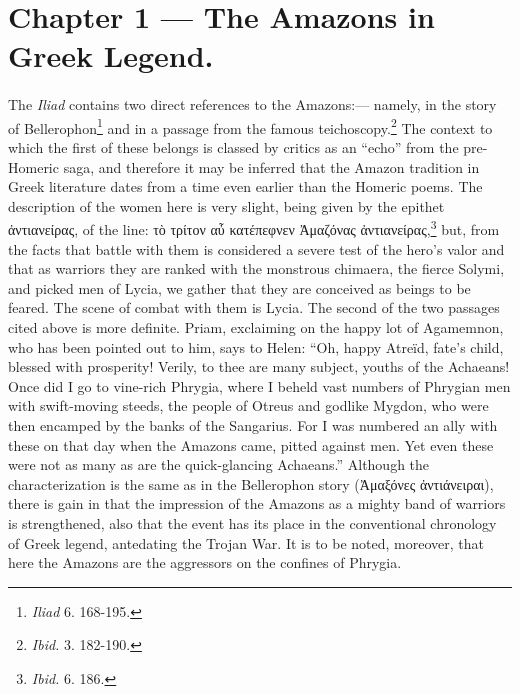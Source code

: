\documentclass[a4paper, 12pt, oneside]{article}
\begin{document}
\paragraph{}
\section{Chapter 1 --- The Amazons in Greek Legend.}
\paragraph{}
The \emph{Iliad} contains two direct references to the Amazons:--- namely, in the story of Bellerophon\footnote{\emph{Iliad} 6. 168-195.} and in a passage from the famous teichoscopy.\footnote{\emph{Ibid.} 3. 182-190.} The context to which the first of these belongs is classed by critics as an ``echo'' from the pre-Homeric saga, and therefore it may be inferred that the Amazon tradition in Greek literature dates from a time even earlier than the Homeric poems. The description of the women here is very slight, being given by the epithet ἀντιανείρας, of the line: τὸ τρίτον αὖ κατέπεφνεν Ἀμαζόνας ἀντιανείρας,\footnote{\emph{Ibid.} 6. 186.} but, from the facts that battle with them is considered a severe test of the hero's valor and that as warriors they are ranked with the monstrous chimaera, the fierce Solymi, and picked men of Lycia, we gather that they are conceived as beings to be feared. The scene of combat with them is Lycia. The second of the two passages cited above is more definite. Priam, exclaiming on the happy lot of Agamemnon, who has been pointed out to him, says to Helen: ``Oh, happy Atreïd, fate's child, blessed with prosperity! Verily, to thee are many subject, youths of the Achaeans! Once did I go to vine-rich Phrygia, where I beheld vast numbers of Phrygian men with swift-moving steeds, the people of Otreus and godlike Mygdon, who were then encamped by the banks of the Sangarius. For I was numbered an ally with these on that day when the Amazons came, pitted against men. Yet even these were not as many as are the quick-glancing Achaeans.'' Although the characterization is the same as in the Bellerophon story (Ἀμαξόνες ἀντιάνειραι), there is gain in that the impression of the Amazons as a mighty band of warriors is strengthened, also that the event has its place in the conventional chronology of Greek legend, antedating the Trojan War. It is to be noted, moreover, that here the Amazons are the aggressors on the confines of Phrygia.
\end{document}
